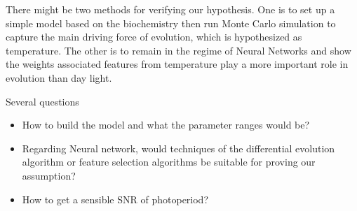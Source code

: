 \documentclass[paper=a4, fontsize=12pt]{scrartcl}	%
\numberwithin{equation}{section}					%
\numberwithin{figure}{section}					%
\numberwithin{table}{section}					%
\begin{document}
There might be two methods for verifying our hypothesis. One is to set up a simple model based on the biochemistry then run Monte Carlo simulation to capture the main driving force of evolution, which is hypothesized as temperature. The other is to remain in the regime of Neural Networks and show the weights associated features from temperature play a more important role in evolution than day light. 

Several questions
\begin{itemize}
\item How to build the model and what the parameter ranges would be?
\item Regarding Neural network, would techniques of the differential evolution algorithm or feature selection algorithms be suitable for proving our assumption?
\item How to get a sensible SNR of photoperiod?
\end{itemize}







\end{document}
